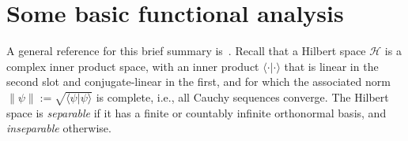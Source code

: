\documentclass[12pt,a4paper]{article}
\newcommand{\1}{\mathds{1}}                         %
\newcommand{\Hcal}{\mathcal {H}}
\newcommand{\Ocal}{\mathcal{O}}
\newcommand{\HH}{{\mathcal{H}}}
\newcommand{\ip}[2]{\langle #1|#2\rangle}
\newtheorem{exercise}[theorem]{Exercise}
\begin{document}





\appendix
\section{Some basic functional analysis}\label{appx:basic_fa}

A general reference for this brief summary is~\cite{ReedSimon:vol1}.
Recall that a Hilbert space $\HH$ is a complex inner product space, with an inner product $\ip{\cdot}{\cdot}$ that is linear in the second slot and conjugate-linear in the first, and for which the associated norm $\|\psi\|:=\sqrt{\ip{\psi}{\psi}}$ is complete, i.e., all Cauchy sequences converge. The Hilbert space is \emph{separable} if it has a finite or countably infinite orthonormal basis, and \emph{inseparable} otherwise.  
\end{document}
